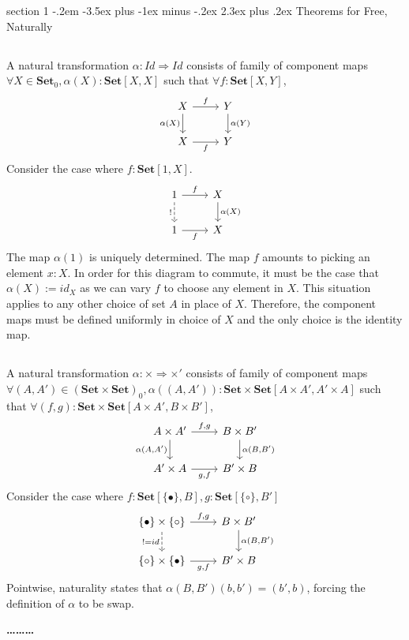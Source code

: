 \documentclass[12pt]{article}
\makeatletter
\theoremstyle{definition}
\newenvironment{problem}{\@startsection
       {section}
       {1}
       {-.2em}
       {-3.5ex plus -1ex minus -.2ex}
       {2.3ex plus .2ex}
       {\pagebreak[3]%
       \large\bf\noindent{Problem }
       }
       }
       {%
       \begin{center}\large\bf \ldots\ldots\ldots\end{center}}
\makeatother
\begin{document}
\begin{problem}{Theorems for Free, Naturally}

\subsection{}
A natural transformation $\alpha : Id \Rightarrow Id$ consists of family of component maps $\forall X \in \textbf{Set}_0, \alpha(X):\textbf{Set}[X,X]$ such that $\forall f : \textbf{Set}[X,Y]$,
\[
    \begin{tikzcd}
        X \arrow[r, "f"] \arrow[d, "\alpha(X)"'] & Y \arrow[d, "\alpha(Y)"] \\
        X \arrow[r, "f"'] & Y
        \end{tikzcd}
\]
Consider the case where $f : \textbf{Set}[1,X]$.
\[
    \begin{tikzcd}
        1 \arrow[r, "f"] \arrow[d,dashed, "!"'] & X \arrow[d, "\alpha(X)"] \\
        1 \arrow[r, "f"'] & X
        \end{tikzcd}
\]
The map $\alpha(1)$ is uniquely determined. The map $f$ amounts to picking an element $x : X$. In order for this diagram to commute, it must be the case that $\alpha(X) := id_X$ as we can vary $f$ to choose any element in $X$. This situation applies to any other choice of set $A$ in place of $X$. Therefore, the component maps must be defined uniformly in choice of $X$ and the only choice is the identity map.

\subsection{}
A natural transformation $\alpha : \times \Rightarrow \times'$ consists of family of component maps $\forall (A,A') \in (\textbf{Set} \times \textbf{Set})_0, \alpha((A,A')):\textbf{Set} \times \textbf{Set}[A \times A', A' \times A]$ such that $\forall (f,g) : \textbf{Set} \times \textbf{Set}[A \times A',B \times B']$,
\[
    \begin{tikzcd}
        A\times A' \arrow[r, "{f,g}"] \arrow[d, "{\alpha(A,A')}"'] & B\times B' \arrow[d, "{\alpha(B,B')}"] \\
        A' \times A \arrow[r, "{g,f}"'] & B'\times B
        \end{tikzcd}
\]
Consider the case where $f : \textbf{Set}[\{\bullet\},B],g : \textbf{Set}[\{\circ\},B']$
\[
    \begin{tikzcd}
        \{\bullet\} \times \{\circ\} \arrow[r, "{f,g}"] \arrow[d,dashed, "!=id"'] & B\times B' \arrow[d, "{\alpha(B,B')}"] \\
        \{\circ\} \times \{\bullet\} \arrow[r, "{g,f}"'] & B'\times B
        \end{tikzcd}
\]
Pointwise, naturality states that $\alpha(B,B')(b,b')=(b',b)$, forcing the definition of $\alpha$ to be swap.


\end{problem}
\end{document}
